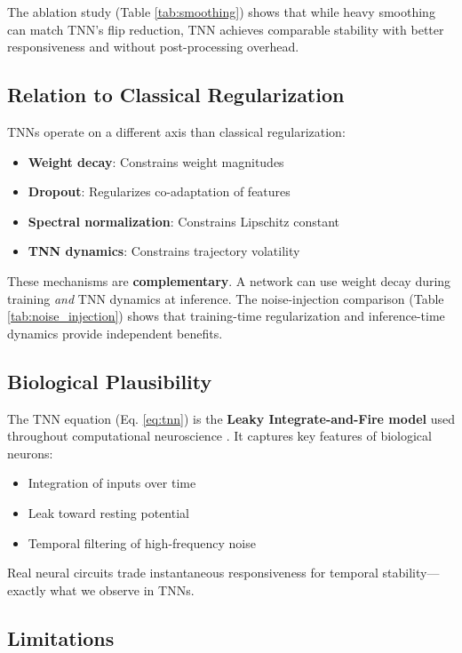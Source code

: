\documentclass[11pt]{article}
\begin{document}
The ablation study (Table \ref{tab:smoothing}) shows that while heavy smoothing can match TNN's flip reduction, TNN achieves comparable stability with better responsiveness and without post-processing overhead.

\subsection{Relation to Classical Regularization}

TNNs operate on a different axis than classical regularization:

\begin{itemize}
    \item \textbf{Weight decay}: Constrains weight magnitudes
    \item \textbf{Dropout}: Regularizes co-adaptation of features
    \item \textbf{Spectral normalization}: Constrains Lipschitz constant
    \item \textbf{TNN dynamics}: Constrains trajectory volatility
\end{itemize}

These mechanisms are \textbf{complementary}. A network can use weight decay during training \emph{and} TNN dynamics at inference. The noise-injection comparison (Table \ref{tab:noise_injection}) shows that training-time regularization and inference-time dynamics provide independent benefits.

\subsection{Biological Plausibility}

The TNN equation (Eq. \ref{eq:tnn}) is the \textbf{Leaky Integrate-and-Fire model} used throughout computational neuroscience \citep{gerstner2002spiking}. It captures key features of biological neurons:

\begin{itemize}
    \item Integration of inputs over time
    \item Leak toward resting potential
    \item Temporal filtering of high-frequency noise
\end{itemize}

Real neural circuits trade instantaneous responsiveness for temporal stability---exactly what we observe in TNNs.

\subsection{Limitations}
\end{document}
